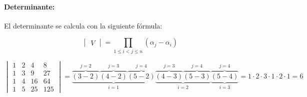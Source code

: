 \paragraph{Determinante: } El determinante se calcula con la siguiente fórmula:

\[\begin{vmatrix} V \end{vmatrix}=\prod_{1 \le i<j\le n}(\alpha_j-\alpha_i)\]

\begin{example}
\[
\begin{vmatrix}
1&2&4&8\\
1&3&9&27\\
1&4&16&64\\
1&5&25&125
\end{vmatrix} = \underbrace{\overbrace{(3-2)}^{j=2}\overbrace{(4-2)}^{j=3}\overbrace{(5-2)}^{j=4}}_{i=1}\underbrace{\overbrace{(4-3)}^{j=3}\overbrace{(5-3)}^{j=4}}_{i=2}\underbrace{\overbrace{(5-4)}^{j=4}}_{i=3} = 1·2·3·1·2·1 = 6
\]
\end{example}

